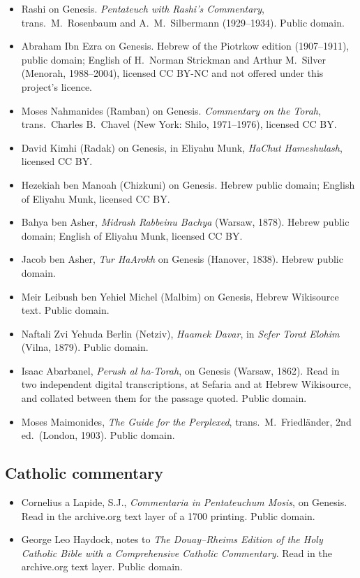 \begin{itemize}[leftmargin=1.2em,itemsep=0.2em,topsep=0.3em]
\item Rashi on Genesis. \textit{Pentateuch with Rashi's Commentary}, trans.\
M.~Rosenbaum and A.~M.~Silbermann (1929--1934). Public domain.
\item Abraham Ibn Ezra on Genesis. Hebrew of the Piotrkow edition (1907--1911),
public domain; English of H.~Norman Strickman and Arthur M.~Silver (Menorah,
1988--2004), licensed CC BY-NC and not offered under this project's licence.
\item Moses Nahmanides (Ramban) on Genesis. \textit{Commentary on the Torah},
trans.\ Charles B.~Chavel (New York: Shilo, 1971--1976), licensed CC BY.
\item David Kimhi (Radak) on Genesis, in Eliyahu Munk, \textit{HaChut
Hameshulash}, licensed CC BY.
\item Hezekiah ben Manoah (Chizkuni) on Genesis. Hebrew public domain; English of
Eliyahu Munk, licensed CC BY.
\item Bahya ben Asher, \textit{Midrash Rabbeinu Bachya} (Warsaw, 1878). Hebrew
public domain; English of Eliyahu Munk, licensed CC BY.
\item Jacob ben Asher, \textit{Tur HaArokh} on Genesis (Hanover, 1838). Hebrew
public domain.
\item Meir Leibush ben Yehiel Michel (Malbim) on Genesis, Hebrew Wikisource text.
Public domain.
\item Naftali Zvi Yehuda Berlin (Netziv), \textit{Haamek Davar}, in \textit{Sefer
Torat Elohim} (Vilna, 1879). Public domain.
\item Isaac Abarbanel, \textit{Perush al ha-Torah}, on Genesis (Warsaw, 1862).
Read in two independent digital transcriptions, at Sefaria and at Hebrew
Wikisource, and collated between them for the passage quoted. Public domain.
\item Moses Maimonides, \textit{The Guide for the Perplexed}, trans.\
M.~Friedl\"ander, 2nd ed.\ (London, 1903). Public domain.
\end{itemize}

\subsection{Catholic commentary}

\begin{itemize}[leftmargin=1.2em,itemsep=0.2em,topsep=0.3em]
\item Cornelius a Lapide, S.J., \textit{Commentaria in Pentateuchum Mosis}, on
Genesis. Read in the archive.org text layer of a 1700 printing. Public domain.
\item George Leo Haydock, notes to \textit{The Douay--Rheims Edition of the Holy
Catholic Bible with a Comprehensive Catholic Commentary}. Read in the archive.org
text layer. Public domain.
\end{itemize}

